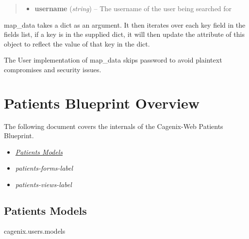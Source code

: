 \documentclass[letterpaper,10pt,english]{sphinxmanual}
\begin{document}
\begin{fulllineitems}
\begin{fulllineitems}
\begin{quote}
\begin{description}
\begin{itemize}
\item {} 
\textbf{username} (\emph{string}) -- The username of the user being searched for

\end{itemize}

\end{description}\end{quote}

\end{fulllineitems}


\begin{fulllineitems}
\label{dev-users:cagenix.users.models.User.map_data}
map\_data takes a dict as an argument. It then iterates
over each key field in the fields list, if a key is
in the supplied dict, it will then update the attribute of
this object to reflect the value of that key in the dict.

The User implementation of map\_data skips password to avoid plaintext
compromises and security issues.

\end{fulllineitems}


\end{fulllineitems}



\chapter{Patients Blueprint Overview}
\label{dev-patients::doc}\label{dev-patients:patients-blueprint-overview}
The following document covers the internals of the Cagenix-Web Patients
Blueprint.
\begin{itemize}
\item {} 
{\hyperref[dev-patients:patients-models-label]{\emph{Patients Models}}}

\item {} 
\emph{patients-forms-label}

\item {} 
\emph{patients-views-label}

\end{itemize}


\section{Patients Models}
\label{dev-patients:patients-models-label}\label{dev-patients:patients-models}\label{dev-patients:module-cagenix.patients.models}
cagenix.users.models
\end{document}
